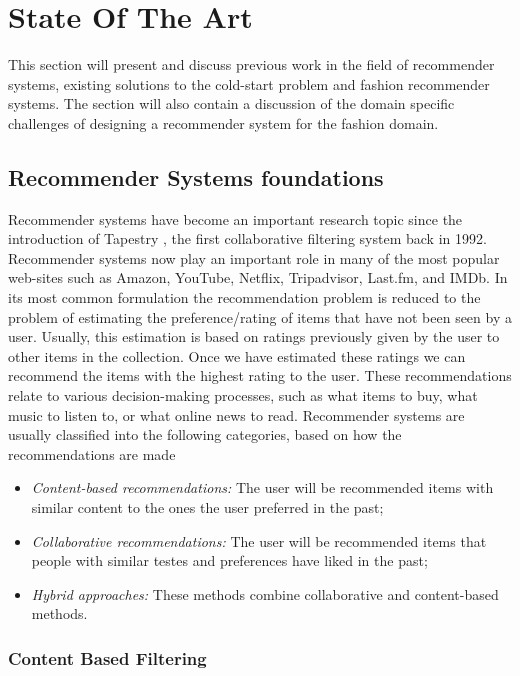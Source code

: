 
\section{State Of The Art}
\label{sec:SotA}

This section will present and discuss previous work in the field of recommender systems, existing solutions to the cold-start problem and fashion recommender systems. The section will also contain a discussion of the domain specific challenges of designing a recommender system for the fashion domain.

\subsection{Recommender Systems foundations}

Recommender systems have become an important research topic since the introduction of Tapestry \cite{Goldberg1992}, the first collaborative filtering system back in 1992. Recommender systems now play an important role in many of the most popular web-sites such as Amazon, YouTube, Netflix, Tripadvisor, Last.fm, and IMDb. In its most common formulation the recommendation problem is reduced to the problem of estimating the preference/rating of items that have not been seen by a user. Usually, this estimation is based on ratings previously given by the user to other items in the collection. Once we have estimated these ratings we can recommend the items with the highest rating to the user. These recommendations relate to various decision-making processes, such as what items to buy, what music to listen to, or what online news to read. Recommender systems are usually classified into the following categories, based on how the recommendations are made \cite{Adomavicius2005}

\begin{itemize}
\item \emph{Content-based recommendations:} The user will be recommended items with similar content to the ones the user preferred in the past;
\item \emph{Collaborative recommendations:} The user will be recommended items that people with similar testes and preferences have liked in the past;
\item \emph{Hybrid approaches:} These methods combine collaborative and content-based methods.
\end{itemize}

\subsubsection{Content Based Filtering}

